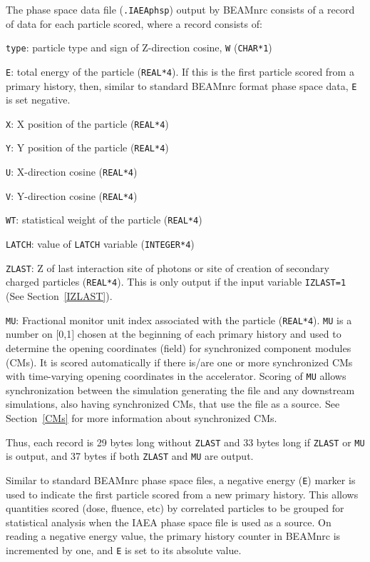 \documentclass[12pt,twoside]{article}
\begin{document}
The phase space data file ({\tt .IAEAphsp}) output by BEAMnrc consists of a record of data for each particle
scored, where a record consists of:
\begin{description}
\item {\tt type}: particle type and sign of Z-direction cosine, {\tt W} ({\tt CHAR*1})
\item {\tt E}: total energy of the particle ({\tt REAL*4}).  If this is the first particle scored
from a primary history, then, similar to standard BEAMnrc format phase space data, {\tt E} is set negative.
\item {\tt X}: X position of the particle ({\tt REAL*4})
\item {\tt Y}: Y position of the particle ({\tt REAL*4})
\item {\tt U}: X-direction cosine ({\tt REAL*4})
\item {\tt V}: Y-direction cosine ({\tt REAL*4})
\item {\tt WT}: statistical weight of the particle ({\tt REAL*4})
\item {\tt LATCH}: value of {\tt LATCH} variable ({\tt INTEGER*4})
\item {\tt ZLAST}: Z of last interaction site of photons or site of creation of secondary
charged particles ({\tt REAL*4}).  This is only output if the input variable {\tt IZLAST=1}
(See Section~\ref{IZLAST}).
\item {\tt MU}: Fractional monitor unit index associated with the particle
({\tt REAL*4}).  {\tt MU} is a number on $[$0,1$]$ chosen at the beginning of each primary history and
used to determine the opening coordinates (field) for synchronized component modules (CMs).
It is scored automatically if there is/are one or more synchronized CMs with time-varying opening
coordinates in the accelerator.  Scoring of {\tt MU} allows
synchronization between the simulation generating the file and any downstream simulations,
also having synchronized CMs, that use the file as a source.  See Section~\ref{CMs} for more information
about synchronized CMs.
\end{description}
Thus, each record is 29 bytes long without {\tt ZLAST} and 33 bytes long if {\tt ZLAST} or {\tt MU} is
output, and 37 bytes if both {\tt ZLAST} and {\tt MU} are output.

Similar to standard BEAMnrc phase space files, a negative energy ({\tt E}) marker is used
to indicate the first particle scored from a new primary history.  This allows quantities
scored (dose, fluence, etc) by correlated particles to be grouped for statistical
analysis when the IAEA phase space file is used as a source.  On reading a negative
energy value, the primary history counter in BEAMnrc is incremented by one, and {\tt E} is set
to its absolute value.
\end{document}

